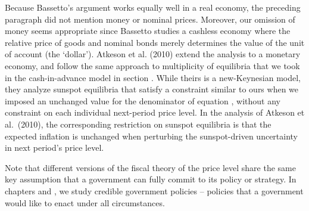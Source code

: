 Because Bassetto's argument works equally well in a real economy, the preceding paragraph did not mention money or nominal prices.
Moreover, our omission of money seems appropriate since Bassetto studies
a cashless economy where the relative price of goods and
nominal bonds merely determines the value of the unit of account
(the `dollar'). Atkeson et al. (2010) extend the analysis
to a monetary economy, and
follow the same approach to multiplicity of equilibria that we took in the
cash-in-advance model in section . %
While theirs is a new-Keynesian model, they
analyze sunspot equilibria that satisfy a constraint similar to ours
when we imposed an unchanged value for the denominator of
equation , without any constraint on each individual
next-period price level. In the analysis of
Atkeson et al.\ (2010), the
corresponding restriction on sunspot equilibria is that the
expected inflation is unchanged when perturbing the sunspot-driven
uncertainty in next period's price level.

Note that  different versions of the fiscal theory of the price level
share the same key assumption that a government can fully commit to
its policy or strategy. In chapters  and ,
we study credible government policies -- policies that a government
would like to enact under all circumstances.



